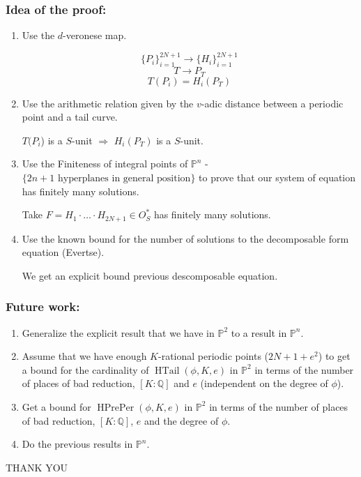 \documentclass{beamer}
\def\PP{{\mathbb P}}
\def\QQ{{\mathbb Q}}
\DeclareMathOperator{\HTail}{HTail}
\DeclareMathOperator{\HPrePer}{HPrePer}
\theoremstyle{thmstyle}
\theoremstyle{thmstyle}
\theoremstyle{mystyle}
\theoremstyle{qstnstyle}
\begin{document}
\begin{frame}
\frametitle{Idea of the proof:}
\begin{enumerate}
\item Use the $d$-veronese map.

\pause
$$\{P_i\}_{i=1}^{2N+1} \rightarrow \{H_i\}_{i=1}^{2N+1}$$
$$T  \rightarrow P_T$$
$$T(P_i)=H_i(P_T) $$

\pause

\item Use the arithmetic relation given by the $v$-adic distance between a periodic point and a tail curve.

\pause
$T(P_i$) is a $S$-unit $\Rightarrow$  $H_i(P_T)$ is a $S$-unit.

\pause

\item Use the Finiteness of integral points of $\PP^n$ - $\{2n+1 \mbox{ hyperplanes in general position}\}$ to prove that our system of equation has finitely many solutions.

\pause
Take $F=H_1 \cdot\ldots\cdot H_{2N+1} \in O_S^{*}$ has finitely many solutions.

\pause

\item Use the known bound for the number of solutions to the decomposable form equation (Evertse).

\pause
We get an explicit bound previous descomposable equation.
\end{enumerate}
\end{frame}



\begin{frame}
\frametitle{Future work:}
\begin{enumerate}
\item Generalize the explicit result that we have in $\PP^2$ to a result in $\PP^n$. 

\vspace{6mm} \pause


\item Assume that we have enough $K$-rational periodic points ($2N+1+e^2$) to get a bound for the cardinality of $\HTail(\phi,K, e)$ in $\PP^2$ in terms of the number of places of bad reduction, $[K:\QQ]$ and $e$ (independent on the degree of $\phi$).


\vspace{6mm} \pause


\item Get a bound for  $\HPrePer(\phi,K, e)$ in $\PP^2$ in terms of the number of places of bad reduction, $[K:\QQ]$, $e$ and the degree of $\phi$.

\vspace{6mm} \pause

\item Do the previous results in $\PP^n$.


\end{enumerate}


\end{frame}






\begin{frame}
\Huge{THANK YOU}
\end{frame}
\end{document}

